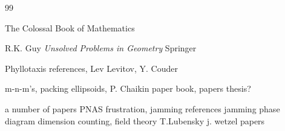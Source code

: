 \documentclass[superscriptaddress,reprint,amsmath,amssymb,aps]{revtex4-1}
\begin{document}

\begin{thebibliography} {99}


 The Colossal Book of Mathematics

 R.K. Guy \textit{Unsolved Problems in Geometry} Springer

 Phyllotaxis references, Lev Levitov, Y. Couder

 m-n-m's, packing ellipsoids, P. Chaikin paper
  book, papers
 thesis?

 a number of papers
 PNAS
 frustration, jamming references
 jamming phase diagram
 dimension counting, field theory  T.Lubensky
 j. wetzel papers


\end{thebibliography}
\end{document}
